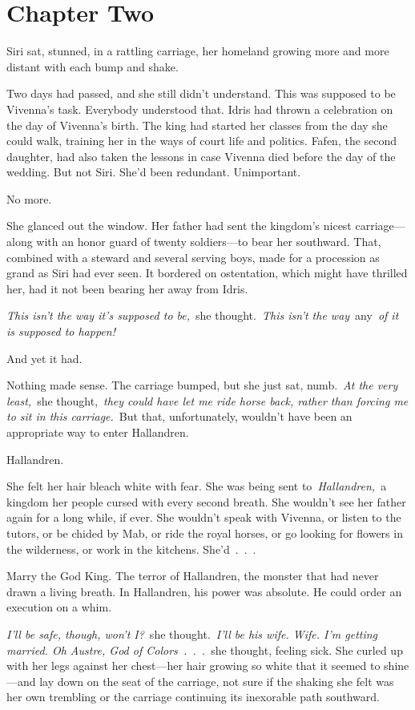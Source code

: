 \section{Chapter Two}

Siri sat, stunned, in a rattling carriage, her homeland growing more and more distant with each bump and shake.

Two days had passed, and she still didn’t understand. This was supposed to be Vivenna’s task. Everybody understood that. Idris had thrown a celebration on the day of Vivenna’s birth. The king had started her classes from the day she could walk, training her in the ways of court life and politics. Fafen, the second daughter, had also taken the lessons in case Vivenna died before the day of the wedding. But not Siri. She’d been redundant. Unimportant.

No more.

She glanced out the window. Her father had sent the kingdom’s nicest carriage—along with an honor guard of twenty soldiers—to bear her southward. That, combined with a steward and several serving boys, made for a procession as grand as Siri had ever seen. It bordered on ostentation, which might have thrilled her, had it not been bearing her away from Idris.

\textit{This isn’t the way it’s supposed to be,}~she thought.~\textit{This isn’t the way}~any~\textit{of it is supposed to happen!}

And yet it had.

Nothing made sense. The carriage bumped, but she just sat, numb.~\textit{At the very least,}~she thought,~\textit{they could have let me ride horse back, rather than forcing me to sit in this carriage.}~But that, unfortunately, wouldn’t have been an appropriate way to enter Hallandren.

Hallandren.

She felt her hair bleach white with fear. She was being sent to~\textit{Hallandren,}~a kingdom her people cursed with every second breath. She wouldn’t see her father again for a long while, if ever. She wouldn’t speak with Vivenna, or listen to the tutors, or be chided by Mab, or ride the royal horses, or go looking for flowers in the wilderness, or work in the kitchens. She’d~.~.~.

Marry the God King. The terror of Hallandren, the monster that had never drawn a living breath. In Hallandren, his power was absolute. He could order an execution on a whim.

\textit{I’ll be safe, though, won’t I?}~she thought.~\textit{I’ll be his wife. Wife. I’m getting married. Oh Austre, God of Colors~.~.~.}~she thought, feeling sick. She curled up with her legs against her chest—her hair growing so white that it seemed to shine—and lay down on the seat of the carriage, not sure if the shaking she felt was her own trembling or the carriage continuing its inexorable path southward.

